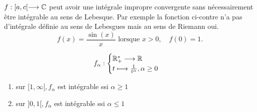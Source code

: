 \begin{minipage}{0.4\textwidth}  %
\end{minipage}%
\hfill
\begin{minipage}{0.55\textwidth}  %
    $f : [a,c[ \longrightarrow \mathbb{C}$ peut avoir une intégrale impropre convergente sans nécessairement être intégrable au sens de Lebesque. 
    Par exemple la fonction ci-contre n'a pas d'intégrale définie au sens de Lebesgues mais au sens de Riemann oui.
    \[
    f(x) = \frac{\sin(x)}{x} \text{ lorsque } x > 0, \quad f(0) = 1.
    \]
\end{minipage}


\begin{example}
    \[ f_\alpha :
        \begin{cases}
            \mathbb{R}_+^* \longrightarrow \mathbb{R} \\
            t \longmapsto \frac{1}{t^\alpha}, \alpha \ge 0
        \end{cases}
    \] 
    \begin{enumerate}
        \item sur $[1, \infty[, f_\alpha$ est intégrable ssi $\alpha \ge 1$
        \item sur $]0, 1[, f_\alpha$ est intégrable ssi $\alpha \le 1$
    \end{enumerate}
\end{example}

